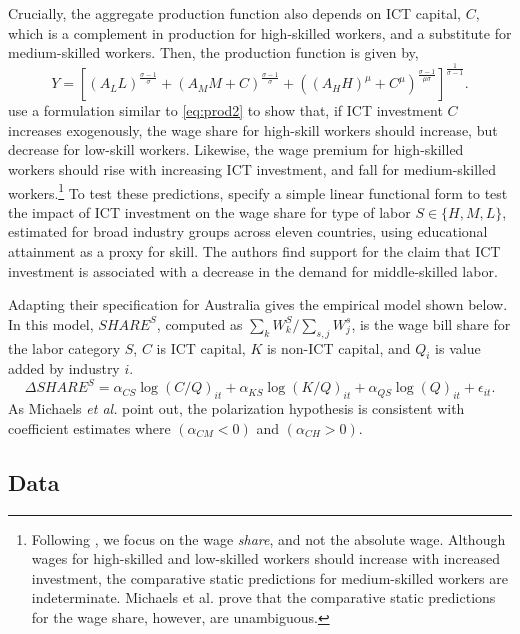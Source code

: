 Crucially, the aggregate production function also depends on ICT capital, $C$, which is a complement in production for high-skilled workers, and a substitute for medium-skilled workers. Then, the production function is given by,
\begin{equation}  \label{eq:prod2}
Y = \left[
  \left(A_LL \right)^\frac{\sigma-1}{\sigma}
  +
  \left(A_MM + C\right)^\frac{\sigma-1}{\sigma}
  +
  \left((A_HH)^\mu + C^\mu\right)^\frac{\sigma-1}{\mu\sigma}
  \right]^\frac{1}{\sigma-1}.
\end{equation}
\citet{Michaels2010} use a formulation similar to \eqref{eq:prod2} to show that, if ICT investment $C$ increases exogenously, the wage share for high-skill workers should increase, but decrease for low-skill workers. Likewise, the wage premium for high-skilled workers should rise with increasing ICT investment, and fall for medium-skilled workers.\footnote{Following \citet{Michaels2010}, we focus on the wage {\em share}, and not the absolute wage. Although wages for high-skilled and low-skilled workers should increase with increased investment, the comparative static predictions for medium-skilled workers are indeterminate. Michaels et al. prove that the comparative static predictions for the wage share, however, are unambiguous.} To test these predictions, \citet{Michaels2010} specify a simple linear functional form to test the impact of ICT investment on the wage share for type of labor $S\in\{H,M,L\}$, estimated for broad industry groups across eleven countries, using educational attainment as a proxy for skill. The authors find support for the claim that ICT investment is associated with a decrease in the demand for middle-skilled labor. 

Adapting their specification for Australia gives the empirical model shown below. In this model, $SHARE^S$, computed as ${\sum_k W^S_k/\sum_{s,j}W^s_j}$, is the wage bill share for the labor category $S$, $C$ is ICT capital, $K$ is non-ICT capital, and $Q_i$ is value added by industry $i$. 
\begin{equation} \label{eq:translog}
\Delta SHARE^S = \alpha_{CS}\log(C/Q)_{it} + \alpha_{KS}\log(K/Q)_{it} + \alpha_{QS}\log(Q)_{it} + \epsilon_{it}.
\end{equation}
As Michaels {\it et al.} point out, the polarization hypothesis is consistent with coefficient estimates where $(\alpha_{CM}<0)$ and $(\alpha_{CH}>0)$.

\subsection{Data}

